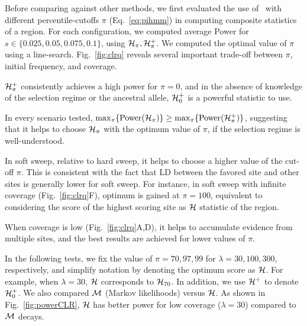 Before comparing against other methods, we first evaluated the use of
\comale\ with different percentile-cutoffs $\pi$ (Eq.~\ref{eq:pihmm})
in computing composite statistics of a region. For each configuration,
we computed average Power for $s\in\{0.025,0.05,0.075,0.1\}$, using
${\cal H}_\pi,{\cal H}^{+}_\pi$. We computed the optimal value of $\pi$ using a
line-search. Fig.~\ref{fig:clrq} reveals several important trade-off
between $\pi$, initial frequency, and coverage.
\begin{packed_itemize}
\item ${\cal H}^{+}_\pi$ consistently achieves a high power for $\pi=0$,
  and in the absence of knowledge of the selection regime or the
  ancestral allele, ${\cal H}^{+}_0$ is a powerful statistic to use.
\item In every scenario tested,
  $\max_{\pi}\{\mbox{Power}({\cal H}_\pi)\}\ge
  \max_{\pi}\{\mbox{Power}({\cal H}^{+}_\pi)\}$, suggesting that it helps
  to choose ${\cal H}_{\pi}$ with the optimum value of $\pi$, if the
  selection regime is well-understood.
\item In soft sweep, relative to hard sweep, it helps to choose a
  higher value of the cut-off $\pi$. This is consistent with the fact that LD
  between the favored site and other sites is generally lower for
  soft sweep. For instance, in soft sweep with infinite coverage
  (Fig.~\ref{fig:clrq}F), optimum is gained at $\pi=100$, equivalent
  to considering the score of the highest scoring site as ${\cal H}$ statistic of 
  the region.
\item When coverage is low (Fig.~\ref{fig:clrq}A,D), it helps to
  accumulate evidence from multiple sites, and the best results are
  achieved for lower values of $\pi$.
\end{packed_itemize}
In the following tests, we fix the value of $\pi=70,97, 99$ for
$\lambda=30,100,300$, respectively, and simplify notation by
denoting the optimum score as ${\cal H}$. For example, when $\lambda=30$,
${\cal H}$ corresponds to ${\cal H}_{70}$. In addition, we use ${\cal H}^{+}$ to
denote ${\cal H}^{+}_0$. We also compared ${\cal M}$ (Markov likelihoods) versus
${\cal H}$. As shown in Fig.~\ref{fig:powerCLR}, ${\cal H}$ has better power for
low coverage ($\lambda=30$) compared to ${\cal M}$ decays.



